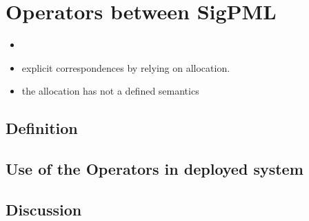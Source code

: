 \section{Operators between SigPML}

\begin{itemize}
	\item {}
	\item explicit correspondences by relying on allocation.
	\item the allocation has not a defined semantics
\end{itemize}
\subsection{Definition}

\subsection{Use of the Operators in deployed system}

\subsection{Discussion}
